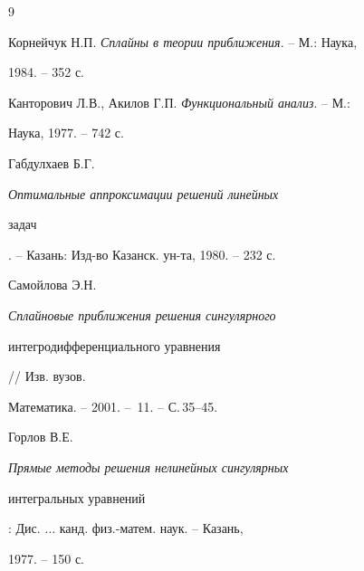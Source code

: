 \begin{thebibliography}{9} 


 




Корнейчук Н.П. {\em Сплайны в теории приближения}. -- М.: Наука, 


1984. -- 352 с. 




Канторович Л.В., Акилов Г.П. {\em Функциональный анализ}. -- М.: 


Наука, 1977. -- 742 с. 




Габдулхаев Б.Г. {\em Оптимальные аппроксимации решений линейных 


задач}. -- Казань: Изд-во Казанск. ун-та, 1980. -- 232 с. 




Самойлова Э.Н. {\em Сплайновые приближения решения сингулярного 


интегродифференциального уравнения} // Изв. вузов. 


Математика. -- 2001. -- \No\,11. -- С.\,35--45. 




Горлов В.Е. {\em Прямые методы решения нелинейных сингулярных 


интегральных уравнений}: Дис. $\dotsc$ канд. физ.-матем. наук. -- Казань, 


1977. -- 150 с. 


 


 


\end{thebibliography} 


 


\vskip 2cm 


 






 


\label{end} 


 








$$ 


